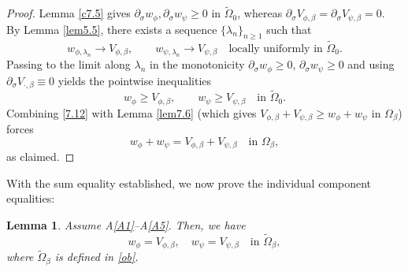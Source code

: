 \documentclass[
  sn-mathphys-num,
  colorlinks,
  linkcolor=darkmagenta,
  citecolor=rufous,
  urlcolor=zaffre,
  hypertexnames=false
]{sn-jnl}
\numberwithin{equation}{section}
\newtheorem{lemma}[theorem]{Lemma}%
\begin{document}
\begin{proof}
Lemma \ref{c7.5} gives $\partial_\sigma w_\phi, \partial_\sigma w_\psi \ge 0$ in $\tilde{\Omega}_0$, whereas  $\partial_\sigma V_{\phi,\beta}=\partial_\sigma V_{\psi,\beta}=0$.\\ By Lemma \ref{lem5.5}, there exists a  sequence $\{\lambda_n\}_{n\ge 1}$
 such that
$$
w_{\phi,\lambda_n}\to V_{\phi,\beta},\qquad w_{\psi,\lambda_n}\to V_{\psi,\beta}\quad\text{locally uniformly in }\tilde{\Omega}_0.
$$
Passing to the limit along $\lambda_n$ in the monotonicity $\partial_\sigma w_\phi\ge 0$, $\partial_\sigma w_\psi\ge 0$ and using $\partial_\sigma V_{\cdot,\beta}\equiv 0$ yields the pointwise inequalities
\begin{equation}\label{7.12}
w_\phi \ge V_{\phi,\beta},\qquad w_\psi \ge V_{\psi,\beta}\quad\text{in }\tilde{\Omega}_0.
\end{equation}
Combining \eqref{7.12} with Lemma \ref{lem7.6} (which gives $V_{\phi,\beta}+V_{\psi,\beta}\ge w_\phi+w_\psi$ in $\Omega_\beta$) forces
$$
w_\phi+w_\psi=V_{\phi,\beta}+V_{\psi,\beta}\quad\text{in }\Omega_\beta,
$$
as claimed.
\end{proof}
With the sum equality established, we now prove the individual component equalities:
\begin{lemma}\label{lem7.8}
Assume A\ref{A1}--A\ref{A5}. Then, we have
$$
w_\phi = V_{\phi, \beta}, \quad w_\psi = V_{\psi, \beta} \quad \text{in } \tilde{\Omega}_\beta,
$$
where $\tilde{\Omega}_\beta$ is defined in \eqref{ob}.

\end{lemma}
\end{document}
